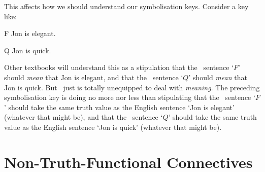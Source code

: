 This affects how we should understand our symbolisation keys. Consider a key like:
	\begin{ekey}
		\item[F] Jon is elegant.
		\item[Q] Jon is quick.
	\end{ekey}
Other textbooks will understand this as a stipulation that the \TFL\ sentence `$F$' should \emph{mean} that Jon is elegant, and that the \TFL\ sentence `$Q$' should \emph{mean} that Jon is quick. But \TFL\ just is totally unequipped to deal with \emph{meaning}. The preceding symbolisation key is doing no more nor less than stipulating that the \TFL\ sentence `$F$' should take the same truth value as the English sentence `Jon is elegant' (whatever that might be), and that the \TFL\ sentence `$Q$' should take the same truth value as the English sentence `Jon is quick' (whatever that might be). 

\section{Non-Truth-Functional Connectives}

